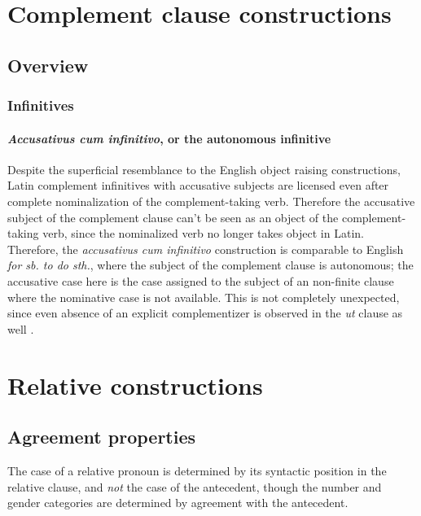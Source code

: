 \documentclass[a4paper, oneside]{report}
\newcommand*{\citepages}[1]{pp.~{#1}}
\newcommand{\form}[1]{\emph{#1}}
\begin{document}
\chapter{Complement clause constructions}\label{chap:complement-clause-construct}

\section{Overview}\label{sec:complement-clause-construct-overview}

\subsection{Infinitives}

\subsubsection{\form{Accusativus cum infinitivo}, or the autonomous infinitive}

Despite the superficial resemblance to the English object raising constructions,
Latin complement infinitives with accusative subjects 
are licensed even after complete nominalization
of the complement-taking verb.
Therefore the accusative subject of the complement clause 
can't be seen as an object of the complement-taking verb, 
since the nominalized verb no longer takes object in Latin.
Therefore, the \form{accusativus cum infinitivo} construction 
is comparable to English \form{for sb. to do sth.},
where the subject of the complement clause is autonomous;
the accusative case here is the case assigned to 
the subject of an non-finite clause where the nominative case is not available.
This is not completely unexpected, 
since even absence of an explicit complementizer 
is observed in the \form{ut} clause as well
\citep[\citepages{290-292}]{oniga2014latin}.

\chapter{Relative constructions}\label{chap:relative-clause}

\section{Agreement properties}\label{sec:relative-clause.overview.agreement}

The case of a relative pronoun is determined 
by its syntactic position in the relative clause, 
and \emph{not} the case of the antecedent,
though the number and gender categories 
are determined by agreement with the antecedent.
\end{document}
